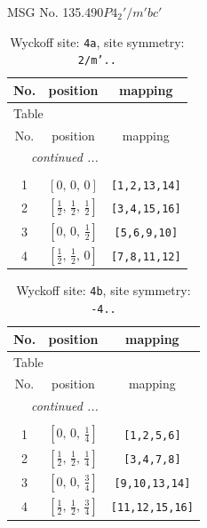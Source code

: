 \documentclass[fleqn,8pt]{jsarticle}
\begin{document}
\setcounter{MaxMatrixCols}{32}

\renewcommand{\tablename}{Table~}
\renewcommand{\figurename}{Figure~}
\begin{center}
\LARGE
MSG No. 135.490\quad$P4_{2}'/m'bc'$
\end{center}
\renewcommand{\arraystretch}{1.2}
\begin{longtable}{ccc}
\caption{Wyckoff site: {\tt 4a}, site symmetry: {\tt 2/m'..}}
 \\
 \hline \hline
No. & position & mapping \\ \hline \endfirsthead

\multicolumn{2}{l}{\tablename\ \thetable{}} \\
 \hline \hline
No. & position & mapping \\ \hline \endhead

 \hline \hline
\multicolumn{2}{r}{\footnotesize\it continued ...} \\ \endfoot

 \hline \hline
\multicolumn{2}{r}{} \\ \endlastfoot

1 & $\left[ 0,\, 0,\, 0 \right]$ & {\tt [1,2,13,14]} \\ \hline
2 & $\left[ \frac{1}{2},\, \frac{1}{2},\, \frac{1}{2} \right]$ & {\tt [3,4,15,16]} \\ \hline
3 & $\left[ 0,\, 0,\, \frac{1}{2} \right]$ & {\tt [5,6,9,10]} \\ \hline
4 & $\left[ \frac{1}{2},\, \frac{1}{2},\, 0 \right]$ & {\tt [7,8,11,12]} \\
\end{longtable}
\renewcommand{\arraystretch}{1.2}
\begin{longtable}{ccc}
\caption{Wyckoff site: {\tt 4b}, site symmetry: {\tt -4..}}
 \\
 \hline \hline
No. & position & mapping \\ \hline \endfirsthead

\multicolumn{2}{l}{\tablename\ \thetable{}} \\
 \hline \hline
No. & position & mapping \\ \hline \endhead

 \hline \hline
\multicolumn{2}{r}{\footnotesize\it continued ...} \\ \endfoot

 \hline \hline
\multicolumn{2}{r}{} \\ \endlastfoot

1 & $\left[ 0,\, 0,\, \frac{1}{4} \right]$ & {\tt [1,2,5,6]} \\ \hline
2 & $\left[ \frac{1}{2},\, \frac{1}{2},\, \frac{1}{4} \right]$ & {\tt [3,4,7,8]} \\ \hline
3 & $\left[ 0,\, 0,\, \frac{3}{4} \right]$ & {\tt [9,10,13,14]} \\ \hline
4 & $\left[ \frac{1}{2},\, \frac{1}{2},\, \frac{3}{4} \right]$ & {\tt [11,12,15,16]} \\
\end{longtable}
\end{document}
